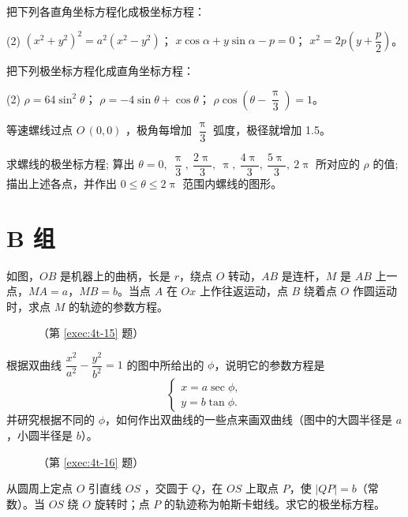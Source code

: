 \begin{question}
\begin{tasks}
  \end{tasks}
  \item 把下列各直角坐标方程化成极坐标方程：
  \begin{tasks}(2)
    \task $\left(x^2+y^2\right)^2=a^2\left(x^2-y^2\right)$；
    \task $x\cos\alpha+y\sin\alpha-p=0$；
    \task $x^2=2p\left(y+\dfrac{p}{2}\right)$。
  \end{tasks}
  \item 把下列极坐标方程化成直角坐标方程：
  \begin{tasks}(2)
    \task $\rho=64\sin^2\theta$；
    \task $\rho=-4\sin\theta+\cos\theta$；
    \task $\rho\cos\left(\theta-\dfrac{\uppi}{3}\right)=1$。
  \end{tasks}
  \item 等速螺线过点 $O\,(0,0)$ ，极角每增加 $\dfrac{\uppi}{3}$ 弧度，极径就增加 1.5。
  \begin{tasks}
    \task 求螺线的极坐标方程;
    \task 算出 $\theta=0,\ \dfrac{\uppi}{3},\ \dfrac{2\uppi}{3},\ \uppi,\ \dfrac{4\uppi}{3},\ \dfrac{5\uppi}{3},\ 2\uppi$ 所对应的 $\rho$ 的值;
    \task 描出上述各点，并作出 $0\leqslant \theta \leqslant 2\uppi$ 范围内螺线的图形。
  \end{tasks}
\end{question}
\section*{B 组}
\begin{question}[resume]
  \item \label{exec:4t-15} 如图，$OB$ 是机器上的曲柄，长是 $r$，绕点 $O$ 转动，$AB$ 是连杆，$M$ 是 $AB$ 上一点，$MA=a$，$MB=b$。当点 $A$ 在 $Ox$ 上作往返运动，点 $B$ 绕着点 $O$ 作圆运动时，求点 $M$ 的轨迹的参数方程。
  \begin{figure}
    \caption*{（第 \ref{exec:4t-15} 题）}
  \end{figure}
  \item \label{exec:4t-16}根据双曲线 $\dfrac{x^2}{a^2}-\dfrac{y^2}{b^2}=1$ 的图中所给出的 $\phi$，说明它的参数方程是
  \[\begin{cases} x=a\sec\phi,\\ y=b\tan\phi.\end{cases} \]
  并研究根据不同的 $\phi$，如何作出双曲线的一些点来画双曲线（图中的大圆半径是 $a$，小圆半径是 $b$）。
  \begin{figure}
    \caption*{（第 \ref{exec:4t-16} 题）}
  \end{figure}
  \item 从圆周上定点 $O$ 引直线 $OS$ ，交圆于 $Q$，在 $OS$ 上取点 $P$，使 $| QP|=b$（常数）。当 $OS$ 绕 $O$ 旋转时；点 $P$ 的轨迹称为帕斯卡蚶线。求它的极坐标方程。
\end{question}

